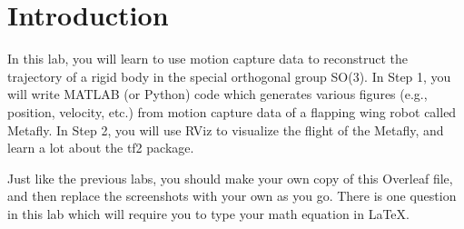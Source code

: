 \documentclass{article}
\numberwithin{figure}{section}
\begin{document}
\section*{Introduction}
In this lab, you will learn to use motion capture data to reconstruct the trajectory of a rigid body in the special orthogonal group SO(3). In Step 1, you will write MATLAB (or Python) code which generates various figures (e.g., position, velocity, etc.) from motion capture data of a flapping wing robot called Metafly. In Step 2, you will use RViz to visualize the flight of the Metafly, and learn a lot about the tf2 package.

Just like the previous labs, you should make your own copy of this Overleaf file, and then replace the screenshots with your own as you go. There is one question in this lab which will require you to type your math equation in LaTeX.
\end{document}

